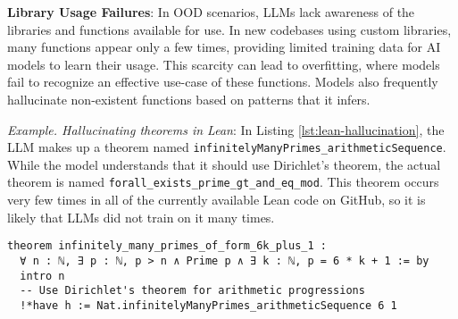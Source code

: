 
\textbf{Library Usage Failures}: In OOD scenarios, LLMs lack awareness of the libraries and functions available for use. In new codebases using custom libraries, many functions appear only a few times, providing limited training data for AI models to learn their usage. This scarcity can lead to overfitting, where models fail to recognize an effective use-case of these functions. Models also frequently hallucinate non-existent functions based on patterns that it infers.

\begin{tcolorbox}[colback=lightblue, boxrule=0pt, arc=5pt, outer arc=5pt, after skip=10pt plus 2pt]
\textit{Example. Hallucinating theorems in Lean}: In Listing \ref{lst:lean-hallucination}, the LLM makes up a theorem named \texttt{infinitelyManyPrimes\_arithmeticSequence}. While the model understands that it should use Dirichlet's theorem, the actual theorem is named \texttt{forall\_exists\_prime\_gt\_and\_eq\_mod}. This theorem occurs very few times in all of the currently available Lean code on GitHub, so it is likely that LLMs did not train on it many times.

\begin{lstlisting}[caption={LLM-generated Lean code snippet that incorrectly uses indexing notation},label={lst:lean-hallucination}, captionpos=t, language=lean, breaklines=true, style=mystyle]
theorem infinitely_many_primes_of_form_6k_plus_1 :
  ∀ n : ℕ, ∃ p : ℕ, p > n ∧ Prime p ∧ ∃ k : ℕ, p = 6 * k + 1 := by
  intro n
  -- Use Dirichlet's theorem for arithmetic progressions
  !*have h := Nat.infinitelyManyPrimes_arithmeticSequence 6 1
\end{lstlisting}
\end{tcolorbox}






